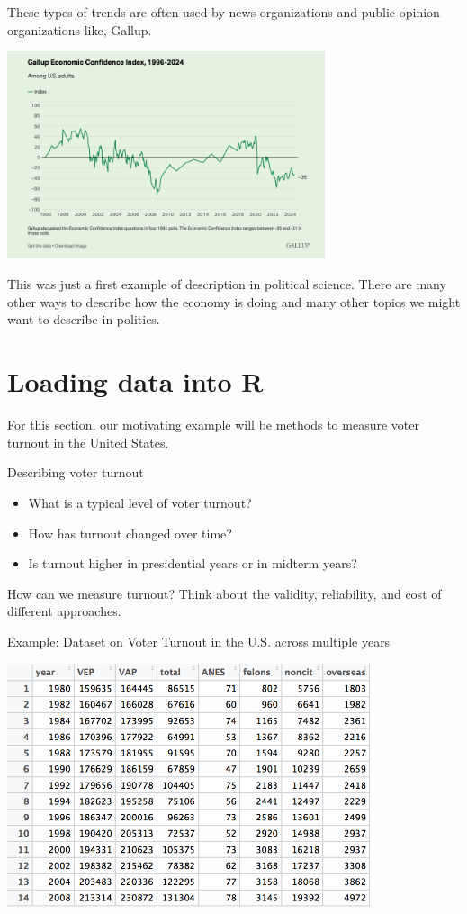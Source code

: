 \documentclass[
  letterpaper,
  DIV=11,
  numbers=noendperiod]{scrreprt}
\providecommand{\tightlist}{%
  \setlength{\itemsep}{0pt}\setlength{\parskip}{0pt}}\usepackage{longtable,booktabs,array}
\begin{document}
These types of trends are often used by news organizations and public
opinion organizations like, Gallup.

\includegraphics[width=0.7\textwidth,height=\textheight]{images/gallupec.png}

This was just a first example of description in political science. There
are many other ways to describe how the economy is doing and many other
topics we might want to describe in politics.

\hypertarget{loading-data-into-r}{%
\section{Loading data into R}\label{loading-data-into-r}}

For this section, our motivating example will be methods to measure
voter turnout in the United States.

Describing voter turnout

\begin{itemize}
\tightlist
\item
  What is a typical level of voter turnout?
\item
  How has turnout changed over time?
\item
  Is turnout higher in presidential years or in midterm years?
\end{itemize}

How can we measure turnout? Think about the validity, reliability, and
cost of different approaches.

Example: Dataset on Voter Turnout in the U.S. across multiple years

\includegraphics[width=0.8\textwidth,height=\textheight]{images/turnoutframe.png}
\end{document}
